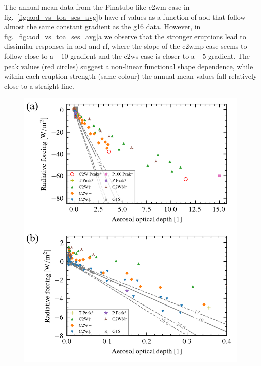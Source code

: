 \documentclass{ametsocV6.1}
\begin{document}
The annual mean data from the Pinatubo-like \gls{c2wm} case in
fig.~\ref{fig:aod_vs_toa_ses_avg}b have \gls{rf} values as a function of \gls{aod} that
follow almost the same constant gradient as the \gls{g16} data. However, in
fig.~\ref{fig:aod_vs_toa_ses_avg}a we observe that the stronger eruptions lead to
dissimilar responses in \gls{aod} and \gls{rf}, where the slope of the \gls{c2wmp} case
seems to follow close to a \(-10\) gradient and the \gls{c2ws} case is closer to a
\(-5\) gradient. The peak values (red circles) suggest a non-linear functional shape
dependence, while within each eruption strength (same colour) the annual mean values
fall relatively close to a straight line.

\begin{figure}
  \centering
  \includegraphics{figures/figure2.png}


\end{figure}
\end{document}
